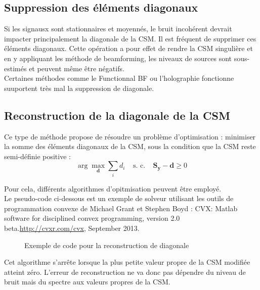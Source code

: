 \subsection{Suppression des éléments diagonaux}
Si les signausx sont stationnaires et moyennés, le bruit incohérent devrait impacter principalement la diagonale de la CSM. Il est fréquent de supprimer ces éléments diagonaux. Cette opération a pour effet de rendre la CSM singulière et en y appliquant les méthode de beamforming, les niveaux de sources sont sous-estimés et peuvent même être négatifs.\\
Certaines méthodes comme le Functionnal BF  ou l'holographie fonctionne suuportent très mal la suppression de diagonale.

\subsection{Reconstruction de la diagonale de la CSM}
Ce type de méthode propose de résoudre un problème d'optimisation : minimiser la somme des éléments diagonaux de la CSM, sous la condition que la CSM reste semi-définie positive : 
\begin{equation}
    \arg\max_{\bm{d}}\sum_i d_i~~~~~\text{s. c.}~~~~~\bm{S_y}-\bm{d}\geq 0
\end{equation}

Pour cela, différents algorithmes d'opitmisation peuvent être employé.\\
Le pseudo-code ci-dessous est un exemple de solveur utilisant les outils de programmation convexe de Michael Grant et Stephen Boyd : CVX: Matlab software for disciplined convex programming, version 2.0 beta.\url{http://cvxr.com/cvx}, September 2013.

\begin{figure}[!h]
	\centering
	\caption{Exemple de code pour la reconstruction de diagonale}
\end{figure}
Cet algorithme s'arrête lorsque la plus petite valeur propre de la CSM modifiée atteint zéro. L'erreur de reconstruction ne va donc pas dépendre du niveau de bruit mais du spectre aux valeurs propres de la CSM. \\
~\\

